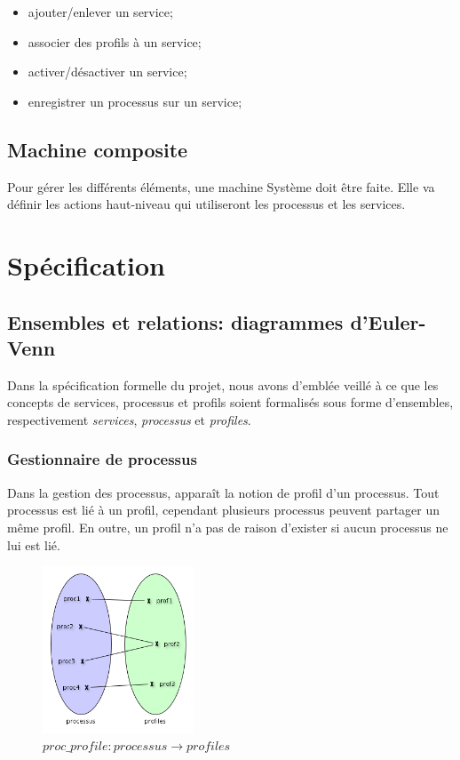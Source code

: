 \documentclass[french, titlepage, 10pt, a4paper]{article}
\begin{document}
            \begin{itemize}
                \item ajouter/enlever un service;
                \item associer des profils à un service;
                \item activer/désactiver un service;
                \item enregistrer un processus sur un service;
            \end{itemize}


\subsection{Machine composite}

Pour gérer les différents éléments, une machine Système doit être faite.
Elle va définir les actions haut-niveau qui utiliseront les processus et les
services.

\section{Spécification}

\subsection{Ensembles et relations: diagrammes d'Euler-Venn}

Dans la spécification formelle du projet, nous avons d'emblée veillé à ce que
les concepts de services, processus et profils soient formalisés sous forme
d'ensembles, respectivement \emph{services}, \emph{processus} et
\emph{profiles}.

\subsubsection{Gestionnaire de processus}

Dans la gestion des processus, apparaît la notion de profil d'un processus.
Tout processus est lié à un profil, cependant plusieurs processus peuvent
partager un même profil.
En outre, un profil n'a pas de raison d'exister si aucun processus ne lui est
lié.

\begin{figure}[htb]
  \centering
  \includegraphics[width=0.4\textwidth]{proc_profile.png}
  \caption{$proc\_profile: processus \rightarrow profiles$}
  \label{fig:proc_profile}
\end{figure}
\end{document}
